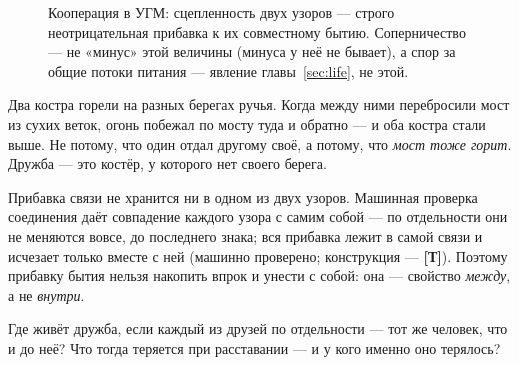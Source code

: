 \documentclass[11pt,letterpaper]{article}
\newcommand{\stT}{\textbf{[Т]}\xspace}
\newcommand{\voiceroseneutral}[4]{%
  \foreach \vang in {90,141.4,192.8,244.3,295.7,347.1,38.6}{%
    \draw[plosgray!40] (#1,#2) -- ($(#1,#2)+(\vang:#3)$);
    \fill[plosblue!65] ($(#1,#2)+(\vang:#3)$) circle (#4);}}
\begin{document}
\begin{figure}[H]
\centering
{}
\caption{Кооперация в УГМ: сцепленность двух узоров --- строго
неотрицательная прибавка к их совместному бытию. Соперничество ---
не «минус» этой величины (минуса у неё не бывает), а спор за общие
потоки питания --- явление главы~\ref{sec:life}, не этой.}
\label{fig:bridge}
\end{figure}

\begin{skazbox}
Два костра горели на разных берегах ручья. Когда между ними
перебросили мост из сухих веток, огонь побежал по мосту туда и
обратно --- и оба костра стали выше. Не потому, что один отдал
другому своё, а потому, что \emph{мост тоже горит}. Дружба --- это
костёр, у которого нет своего берега.
\end{skazbox}

\begin{factbox}
Прибавка связи не хранится ни в одном из двух узоров. Машинная
проверка соединения даёт совпадение каждого узора с самим собой ---
по отдельности они не меняются вовсе, до последнего знака; вся
прибавка лежит в самой связи и исчезает только вместе с ней
(машинно проверено; конструкция --- \stT). Поэтому прибавку бытия
нельзя накопить впрок и унести с собой: она --- свойство
\emph{между}, а не \emph{внутри}.
\end{factbox}

\begin{askbox}
Где живёт дружба, если каждый из друзей по отдельности --- тот же
человек, что и до неё? Что тогда теряется при расставании --- и у
кого именно оно терялось?
\end{askbox}

\end{document}
